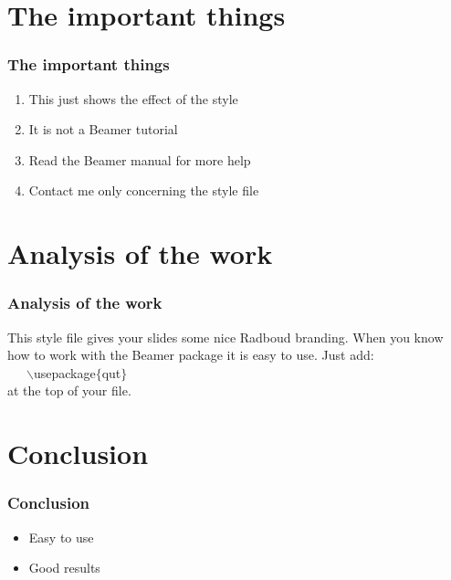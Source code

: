 \documentclass{beamer}
\begin{document}
\section{The important things}

\begin{frame}
  \frametitle{The important things}

  \begin{enumerate}
    \item This just shows the effect of the style
    \item It is not a Beamer tutorial
    \item Read the Beamer manual for more help
    \item Contact me only concerning the style file
  \end{enumerate}
\end{frame}

\section{Analysis of the work}

\begin{frame}
  \frametitle{Analysis of the work}

  This style file gives your slides some nice Radboud branding.
  When you know how to work with the Beamer package it is easy to use.
  Just add:\\ ~~~$\backslash$usepackage$\{$qut$\}$ \\ at the top of your file.
\end{frame}

\section{Conclusion}

\begin{frame}
  \frametitle{Conclusion}

  \begin{itemize}
    \item Easy to use
    \item Good results
  \end{itemize}
\end{frame}
\end{document}
